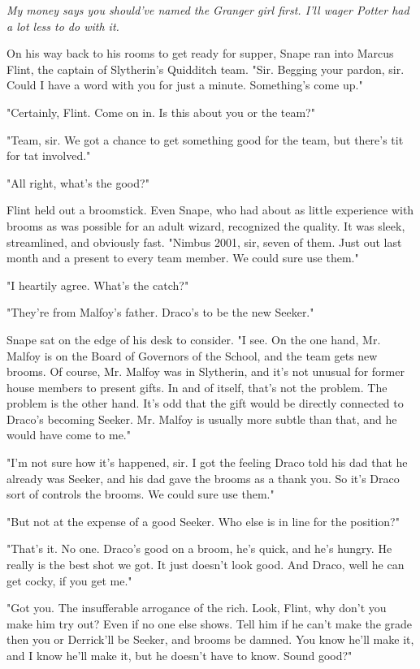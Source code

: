 \documentclass[a4paper,11pt]{article}
\begin{document}
\emph{My money says you should've named the Granger girl first. I'll wager Potter had a lot less to do with it.}

On his way back to his rooms to get ready for supper, Snape ran into Marcus Flint, the captain of Slytherin's Quidditch team. "Sir. Begging your pardon, sir. Could I have a word with you for just a minute. Something's come up."

"Certainly, Flint. Come on in. Is this about you or the team?"

"Team, sir. We got a chance to get something good for the team, but there's tit for tat involved."

"All right, what's the good?"

Flint held out a broomstick. Even Snape, who had about as little experience with brooms as was possible for an adult wizard, recognized the quality. It was sleek, streamlined, and obviously fast. "Nimbus 2001, sir, seven of them. Just out last month and a present to every team member. We could sure use them."

"I heartily agree. What's the catch?"

"They're from Malfoy's father. Draco's to be the new Seeker."

Snape sat on the edge of his desk to consider. "I see. On the one hand, Mr. Malfoy is on the Board of Governors of the School, and the team gets new brooms. Of course, Mr. Malfoy was in Slytherin, and it's not unusual for former house members to present gifts. In and of itself, that's not the problem. The problem is the other hand. It's odd that the gift would be directly connected to Draco's becoming Seeker. Mr. Malfoy is usually more subtle than that, and he would have come to me."

"I'm not sure how it's happened, sir. I got the feeling Draco told his dad that he already was Seeker, and his dad gave the brooms as a thank you. So it's Draco sort of controls the brooms. We could sure use them."

"But not at the expense of a good Seeker. Who else is in line for the position?"

"That's it. No one. Draco's good on a broom, he's quick, and he's hungry. He really is the best shot we got. It just doesn't look good. And Draco, well he can get cocky, if you get me."

"Got you. The insufferable arrogance of the rich. Look, Flint, why don't you make him try out? Even if no one else shows. Tell him if he can't make the grade then you or Derrick'll be Seeker, and brooms be damned. You know he'll make it, and I know he'll make it, but he doesn't have to know. Sound good?"
\end{document}
